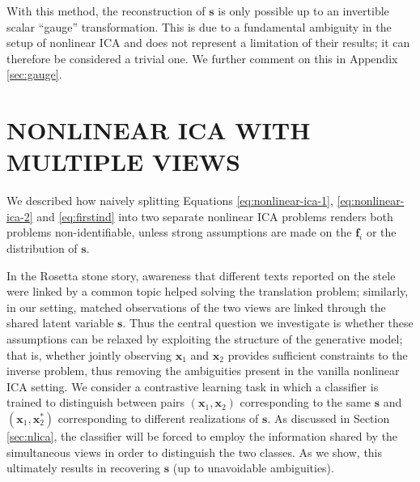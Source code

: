 \documentclass[letterpaper]{article}
\theoremstyle{definition}
\begin{document}
With this method, the reconstruction of $\bm{s}$ is only possible up to an invertible scalar ``gauge'' transformation. This is due to a fundamental ambiguity in the setup of nonlinear ICA and does not represent a limitation of their results; it can therefore be considered a trivial one. We further comment on this in Appendix \ref{sec:gauge}.

\section{NONLINEAR ICA WITH MULTIPLE VIEWS}
\label{sec:nlica-with-multiple-views}


We described how naively splitting Equations \ref{eq:nonlinear-ica-1}, \ref{eq:nonlinear-ica-2} and \ref{eq:firstind} into two separate nonlinear ICA problems renders both problems non-identifiable, unless strong assumptions are made on the $\bm{f}_i$ or the distribution of $\bm{s}$.



In the Rosetta stone story, awareness that different texts reported on the stele were linked by a common topic helped solving the translation problem; similarly, in our setting, matched observations of the two views are linked through the shared latent variable $\bm{s}$. Thus the central question we investigate is whether these assumptions can be relaxed by exploiting the structure of the generative model; that is, whether jointly observing $\bm{x}_1$ and $\bm{x}_2$ provides sufficient constraints to the inverse problem, thus removing the ambiguities present in the vanilla nonlinear ICA setting.
We consider a contrastive learning task in which a classifier is trained to distinguish between pairs $(\bm{x}_1, \bm{x}_2)$ corresponding to the same $\bm{s}$ and $(\bm{x}_1, \bm{x}^*_2)$ corresponding to different realizations of $\bm{s}$.
As discussed in Section \ref{sec:nlica}, the classifier will be forced to employ the information shared by the simultaneous views in order to distinguish the two classes.
As we show, this ultimately results in recovering $\bm{s}$ (up to unavoidable ambiguities).
\end{document}
